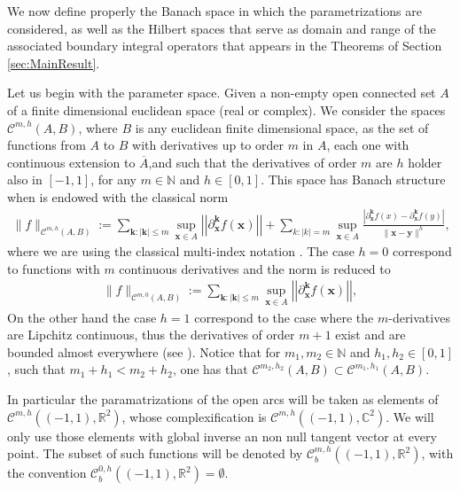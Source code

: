 \documentclass{article}
\newcommand{\IC}{{\mathbb C}}
\newcommand{\IN}{{\mathbb N}}
\newcommand{\IR}{{\mathbb R}}
\newcommand{\cmspaceh}[4]{\mathcal{C}^{#1,#2} \left( #3, #4 \right)}
\newcommand{\rgeoh}[2]{\mathcal{C}_b^{#1,#2}\left( (-1,1), \IR^2 \right)}
\newcommand{\bk}{\bm{k}}
\newcommand{\bx}{\bm{x}}
\newcommand{\by}{\bm{y}}
\begin{document}
We now define properly the Banach space in which the parametrizations are considered, as well as the Hilbert spaces that serve as domain and range of the associated boundary integral operators that appears in the Theorems of Section \ref{sec:MainResult}.

Let us begin with the parameter space. Given a non-empty open connected set $A$ of a finite dimensional euclidean space (real or complex). We consider the spaces $\cmspaceh{m}{h}{A}{B}$, where $B$ is any euclidean finite dimensional space, as the set of functions from $A$ to $B$ with derivatives up to order $m$ in $A$, each one with continuous extension to $\overline{A}$,and such that the derivatives of order $m$ are $h$ holder   also in $[-1,1]$, for any $m\in \IN$ and $h \in [0,1]$. This space has Banach structure when is endowed with the classical norm 
\begin{align*}
\| f \|_{\cmspaceh{m}{h}{A}{B}} := \sum_{\bk: |\bk| \leq m } \sup_{\bx \in A}  \left\vert\left\vert\partial_{\bx}^{\bk} f(\bx) \right\vert\right\vert+ \sum_{k: |k| =m} \sup_{\bx \in A}  \frac{|\partial_{\bx}^{\bk}f(x)-\partial_{\bx}^{\bk}f(y)|}{\| \bx - \by\|^h},
\end{align*}
where we are using the classical multi-index notation \cite[pg. 61]{mclean2000strongly}.  The case $h=0$ correspond to functions with $m$ continuous derivatives and the norm is reduced to 
\begin{align*}
\| f \|_{\cmspaceh{m}{0}{A}{B}} := \sum_{\bk: |\bk| \leq m } \sup_{\bx \in A}  \left\vert\left\vert\partial_{\bx}^{\bk} f(\bx) \right\vert\right\vert,
\end{align*}
On the other hand the case $h=1$ correspond to the case where the $m$-derivatives are Lipchitz continuous, thus the derivatives of order $m+1$ exist and are bounded almost everywhere (see \cite[pg. 280]{evans1998partial}). Notice that for $m_1, m_2 \in \IN$ and $h_1, h_2 \in [0,1]$, such that $m_1 + h_1 < m_2 + h_2$, one has that $\cmspaceh{m_2}{h_2}{A}{B} \subset \cmspaceh{m_1}{h_1}{A}{B}$.

In particular the paramatrizations of the open arcs will be taken as elements of $\cmspaceh{m}{h}{(-1,1)}{\IR^2}$, whose complexification is $\cmspaceh{m}{h}{(-1,1)}{\IC^2}$. We will only use those elements with global inverse an non null tangent vector at every point. The subset of such functions will be denoted by $\rgeoh{m}{h}$, with the convention $\rgeoh{0}{h}  = \emptyset$.
\end{document}
